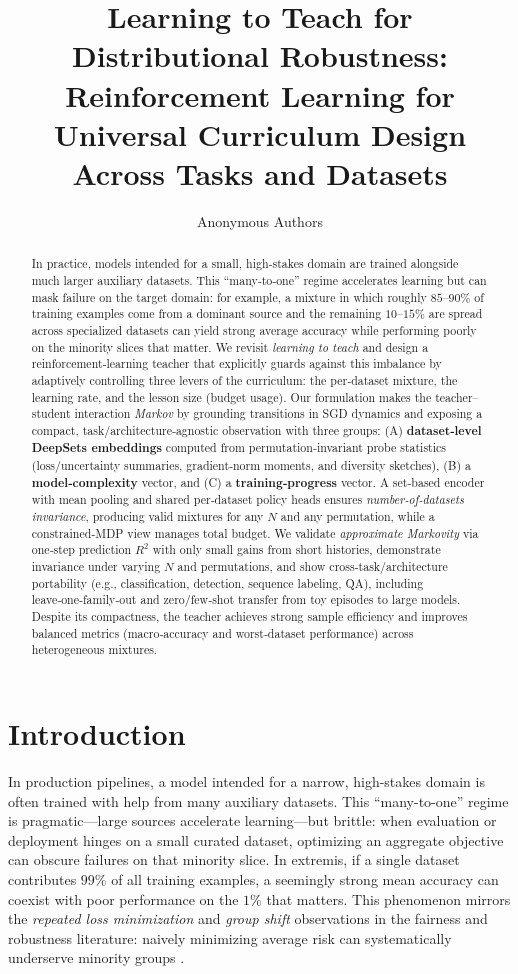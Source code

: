 \documentclass[11pt]{article}
\title{\textbf{Learning to Teach for Distributional Robustness: \\Reinforcement Learning for Universal Curriculum Design Across Tasks and Datasets}}
\author{Anonymous Authors}
\date{}
\newcommand{\1}{\mathbf{1}}
\begin{document}
\maketitle

\begin{abstract}
In practice, models intended for a small, high‑stakes domain are trained alongside much larger auxiliary datasets. This “many‑to‑one” regime accelerates learning but can mask failure on the target domain: for example, a mixture in which roughly $85$–$90\%$ of training examples come from a dominant source and the remaining $10$–$15\%$ are spread across specialized datasets can yield strong average accuracy while performing poorly on the minority slices that matter. We revisit \emph{learning to teach} and design a reinforcement‑learning teacher that explicitly guards against this imbalance by adaptively controlling three levers of the curriculum: the per‑dataset mixture, the learning rate, and the lesson size (budget usage). Our formulation makes the teacher–student interaction \emph{Markov} by grounding transitions in SGD dynamics and exposing a compact, task/architecture‑agnostic observation with three groups: (A) \textbf{dataset‑level DeepSets embeddings} computed from permutation‑invariant probe statistics (loss/uncertainty summaries, gradient‑norm moments, and diversity sketches), (B) a \textbf{model‑complexity} vector, and (C) a \textbf{training‑progress} vector. A set‑based encoder with mean pooling and shared per‑dataset policy heads ensures \emph{number‑of‑datasets invariance}, producing valid mixtures for any $N$ and any permutation, while a constrained‑MDP view manages total budget. We validate \emph{approximate Markovity} via one‑step prediction $R^2$ with only small gains from short histories, demonstrate invariance under varying $N$ and permutations, and show cross‑task/architecture portability (e.g., classification, detection, sequence labeling, QA), including leave‑one‑family‑out and zero/few‑shot transfer from toy episodes to large models. Despite its compactness, the teacher achieves strong sample efficiency and improves balanced metrics (macro‑accuracy and worst‑dataset performance) across heterogeneous mixtures.
\end{abstract}

\section{Introduction}
In production pipelines, a model intended for a narrow, high-stakes domain is often trained with help from many auxiliary datasets. This “many-to-one” regime is pragmatic—large sources accelerate learning—but brittle: when evaluation or deployment hinges on a small curated dataset, optimizing an aggregate objective can obscure failures on that minority slice. In extremis, if a single dataset contributes $99\%$ of all training examples, a seemingly strong mean accuracy can coexist with poor performance on the $1\%$ that matters. This phenomenon mirrors the \emph{repeated loss minimization} and \emph{group shift} observations in the fairness and robustness literature: naively minimizing average risk can systematically underserve minority groups \citep{hashimoto2018fairness,sagawa2020dro}.
\end{document}
